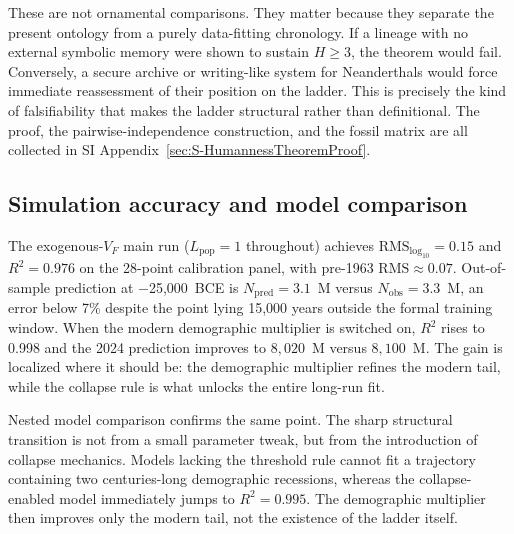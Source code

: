 \documentclass[11pt]{article}
\begin{document}
These are not ornamental comparisons.
They matter because they separate the present ontology from a purely data-fitting chronology.
If a lineage with no external symbolic memory were shown to sustain
\(H\ge 3\),
the theorem would fail.
Conversely,
a secure archive or writing-like system for Neanderthals would force immediate reassessment of their position on the ladder.
This is precisely the kind of falsifiability that makes the ladder structural rather than definitional.
The proof,
the pairwise-independence construction,
and the fossil matrix are all collected in SI Appendix~\ref{sec:S-HumannessTheoremProof}.

\subsection{Simulation accuracy and model comparison}\label{sec:accuracy}

The exogenous-\(V_F\) main run
(\(L_{\mathrm{pop}}=1\) throughout)
achieves
\(\mathrm{RMS}_{\log_{10}}=0.15\)
and
\(R^2=0.976\)
on the 28-point calibration panel,
with pre-1963
\(\mathrm{RMS}\approx 0.07\).
Out-of-sample prediction at
\(-\)25,000~BCE is
\(N_{\mathrm{pred}}=3.1\)~M versus
\(N_{\mathrm{obs}}=3.3\)~M,
an error below 7\% despite the point lying 15,000 years outside the formal training window.
When the modern demographic multiplier is switched on,
\(R^2\) rises to
0.998 and the 2024 prediction improves to
\(8{,}020\)~M versus
\(8{,}100\)~M.
The gain is localized where it should be:
the demographic multiplier refines the modern tail,
while the collapse rule is what unlocks the entire long-run fit.

Nested model comparison confirms the same point.
The sharp structural transition is not from a small parameter tweak,
but from the introduction of collapse mechanics.
Models lacking the threshold rule cannot fit a trajectory containing two centuries-long demographic recessions,
whereas the collapse-enabled model immediately jumps to
\(R^2=0.995\).
The demographic multiplier then improves only the modern tail,
not the existence of the ladder itself.
\end{document}
